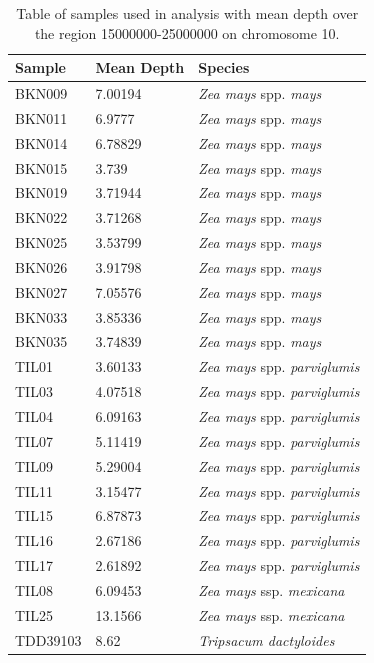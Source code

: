 \begin{table}
\begin{center}
	\begin{tabular} { | p{5cm} | p{5cm} | p{5cm} | }
	\hline
	\textbf{Sample} & \textbf{Mean Depth} & \textbf{Species} \\ \hline \hline
	BKN009 & 7.00194 & {\it Zea mays} spp. {\it mays}\\ \hline
	BKN011 & 6.9777  & {\it Zea mays} spp. {\it mays}\\ \hline
	BKN014 & 6.78829 & {\it Zea mays} spp. {\it mays} \\ \hline
	BKN015 & 3.739 & {\it Zea mays} spp. {\it mays} \\ \hline
	BKN019 & 3.71944 & {\it Zea mays} spp. {\it mays} \\ \hline
	BKN022 & 3.71268 & {\it Zea mays} spp. {\it mays} \\ \hline
	BKN025 & 3.53799 & {\it Zea mays} spp. {\it mays} \\ \hline
	BKN026 & 3.91798 & {\it Zea mays} spp. {\it mays} \\ \hline
	BKN027 & 7.05576 & {\it Zea mays} spp. {\it mays} \\ \hline
	BKN033 & 3.85336 & {\it Zea mays} spp. {\it mays} \\ \hline
	BKN035 & 3.74839 & {\it Zea mays} spp. {\it mays} \\ \hline
	TIL01 & 3.60133 & {\it Zea mays} spp. {\it parviglumis}\\ \hline
	TIL03 & 4.07518 & {\it Zea mays} spp. {\it parviglumis} \\ \hline
	TIL04 & 6.09163 & {\it Zea mays} spp. {\it parviglumis} \\ \hline
	TIL07 & 5.11419 & {\it Zea mays} spp. {\it parviglumis} \\ \hline
	TIL09 & 5.29004 & {\it Zea mays} spp. {\it parviglumis} \\ \hline
	TIL11 & 3.15477 & {\it Zea mays} spp. {\it parviglumis} \\ \hline
	TIL15 & 6.87873 & {\it Zea mays} spp. {\it parviglumis} \\ \hline
	TIL16 & 2.67186 & {\it Zea mays} spp. {\it parviglumis} \\ \hline
	TIL17 & 2.61892 & {\it Zea mays} spp. {\it parviglumis} \\ \hline
	TIL08 & 6.09453 & \textit{Zea mays} ssp. {\it mexicana} \\ \hline
	TIL25 & 13.1566 & \textit{Zea mays} ssp. {\it mexicana} \\ \hline
	TDD39103 & 8.62 & \textit{Tripsacum dactyloides} \\ \hline
	\end{tabular}
	\caption{Table of samples used in analysis with mean depth over the region 15000000-25000000 on chromosome 10.}
	\label{tab:samples}
	\end{center}
\end{table}

